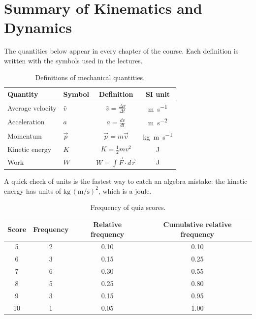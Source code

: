 \documentclass[11pt]{article}
\begin{document}
\clearpage
\section*{Summary of Kinematics and Dynamics}

The quantities below appear in every chapter of the course. Each definition is written
with the symbols used in the lectures.

\begin{table}[h]
\centering
\caption{Definitions of mechanical quantities.}
\label{tab:defs}
\renewcommand{\arraystretch}{2.1}
\begin{tabular}{llcc}
\toprule
Quantity & Symbol & Definition & SI unit \\
\midrule
Average velocity & $\bar{v}$ & $\displaystyle \bar{v} = \frac{\Delta x}{\Delta t}$ & \si{\metre\per\second} \\
Acceleration & $a$ & $\displaystyle a = \frac{dv}{dt}$ & \si{\metre\per\second\squared} \\
Momentum & $\vec{p}$ & $\vec{p} = m\vec{v}$ & \si{\kilogram\metre\per\second} \\
Kinetic energy & $K$ & $K = \tfrac{1}{2}mv^2$ & \si{\joule} \\
Work & $W$ & $W = \int \vec{F}\cdot d\vec{r}$ & \si{\joule} \\
\bottomrule
\end{tabular}
\end{table}

A quick check of units is the fastest way to catch an algebra mistake: the kinetic
energy has units of $\si{\kilogram}\,(\si{\metre\per\second})^2$, which is a joule.

\begin{table}[h]
\centering
\caption{Frequency of quiz scores.}
\label{tab:freq}
\begin{tabular}{|c|c|c|c|}
\hline
Score & Frequency & Relative frequency & Cumulative relative frequency \\
\hline
5 & 2 & 0.10 & 0.10 \\
\hline
6 & 3 & 0.15 & 0.25 \\
\hline
7 & 6 & 0.30 & 0.55 \\
\hline
8 & 5 & 0.25 & 0.80 \\
\hline
9 & 3 & 0.15 & 0.95 \\
\hline
10 & 1 & 0.05 & 1.00 \\
\hline
\end{tabular}
\end{table}
\end{document}
